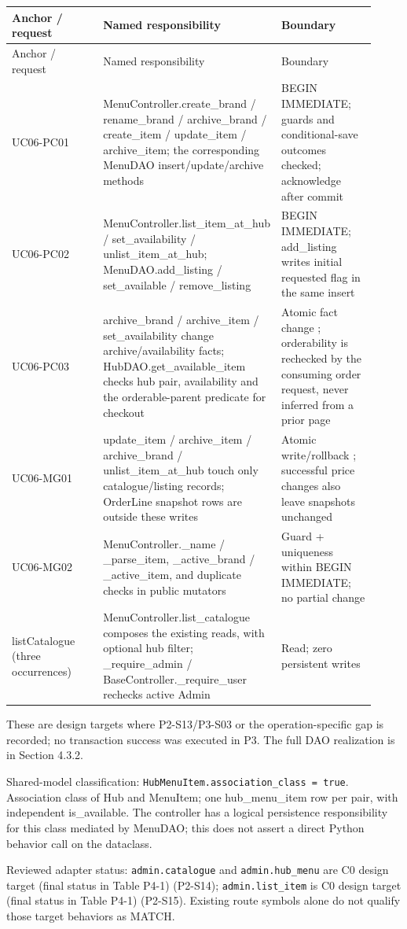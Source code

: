 \begin{longtable}{>{\raggedright\arraybackslash}p{0.3067\linewidth}>{\raggedright\arraybackslash}p{0.3067\linewidth}>{\raggedright\arraybackslash}p{0.3067\linewidth}}
Anchor / request & Named responsibility & Boundary \\
\hline\endfirsthead
Anchor / request & Named responsibility & Boundary \\
\hline\endhead
UC06-PC01 & MenuController.create\_brand / rename\_brand / archive\_brand / create\_item / update\_item / archive\_item; the corresponding MenuDAO insert/update/archive methods & BEGIN IMMEDIATE; guards and conditional-save outcomes checked; acknowledge after commit \\
UC06-PC02 & MenuController.list\_item\_at\_hub / set\_availability / unlist\_item\_at\_hub; MenuDAO.add\_listing / set\_available / remove\_listing & BEGIN IMMEDIATE; add\_listing writes initial requested flag in the same insert \\
UC06-PC03 & archive\_brand / archive\_item / set\_availability change archive/availability facts; HubDAO.get\_available\_item checks hub pair, availability and the orderable-parent predicate for checkout & Atomic fact change ; orderability is rechecked by the consuming order request, never inferred from a prior page \\
UC06-MG01 & update\_item / archive\_item / archive\_brand / unlist\_item\_at\_hub touch only catalogue/listing records; OrderLine snapshot rows are outside these writes & Atomic write/rollback ; successful price changes also leave snapshots unchanged \\
UC06-MG02 & MenuController.\_name / \_parse\_item, \_active\_brand / \_active\_item, and duplicate checks in public mutators & Guard + uniqueness within BEGIN IMMEDIATE; no partial change \\
listCatalogue (three occurrences) & MenuController.list\_catalogue  composes the existing reads, with optional hub filter; \_require\_admin / BaseController.\_require\_user rechecks active Admin & Read; zero persistent writes \\
\end{longtable}
These are design targets where P2-S13/P3-S03 or the operation-specific gap is recorded; no transaction success was executed in P3. The full DAO realization is in Section 4.3.2.

Shared-model classification: \texttt{HubMenuItem.\allowbreak{}association\_\allowbreak{}class = true}. Association class of Hub and MenuItem; one hub\_menu\_item row per pair, with independent is\_available. The controller has a logical persistence responsibility for this class mediated by MenuDAO; this does not assert a direct Python behavior call on the dataclass.

Reviewed adapter status: \texttt{admin.\allowbreak{}catalogue} and \texttt{admin.\allowbreak{}hub\_\allowbreak{}menu} are C0 design target (final status in Table P4-1)  (P2-S14); \texttt{admin.\allowbreak{}list\_\allowbreak{}item} is C0 design target (final status in Table P4-1)  (P2-S15). Existing route symbols alone do not qualify those target behaviors as MATCH.
